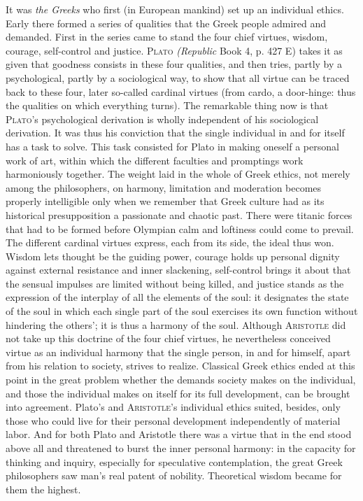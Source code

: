 \documentclass[12pt,a4paper,openany]{book}
\newcommand{\opage}[1]{\marginnote{\footnotesize\textit{[#1]}}}
\begin{document}
It was \textit{the Greeks} who first (in European mankind) set up an individual ethics. Early there formed a
series of qualities that the Greek people admired and demanded. First in the series came to stand the four chief
virtues, wisdom, courage, self-control and justice. \textsc{Plato} \textit{(Republic} Book 4, p. 427 E) takes it as
given that goodness consists in these four qualities, and then tries, partly by a psychological, partly by a
sociological way, to show that all virtue can be traced back to these four, later so-called cardinal virtues
(from cardo, a door-hinge: thus the qualities on which everything turns). The remarkable thing now is that
\textsc{Plato}'s psychological derivation is wholly independent of his sociological derivation. It was thus his
conviction that the single individual in and for itself has a task to solve. This task consisted for Plato in
making oneself a personal work of art, within which the different faculties and promptings work harmoniously
together. The weight laid in the whole of Greek ethics, not merely among the philosophers, on harmony,
limitation and moderation becomes properly intelligible only when we remember that Greek culture had as its
historical presupposition a passionate and chaotic past. There were titanic forces that had to be formed before
Olympian calm and loftiness could come to prevail. The different cardinal virtues express, each from its side,
the ideal thus won.
\opage{202}Wisdom lets thought be the guiding power, courage holds up personal dignity against external resistance
and inner slackening, self-control brings it about that the sensual impulses are limited without being killed,
and justice stands as the expression of the interplay of all the elements of the soul: it designates the state
of the soul in which each single part of the soul exercises its own function without hindering the others'; it
is thus a harmony of the soul. Although \textsc{Aristotle} did not take up this doctrine of the four chief
virtues, he nevertheless conceived virtue as an individual harmony that the single person, in and for himself,
apart from his relation to society, strives to realize. Classical Greek ethics ended at this point in the great
problem whether the demands society makes on the individual, and those the individual makes on itself for its
full development, can be brought into agreement. Plato's and \textsc{Aristotle}'s individual ethics suited,
besides, only those who could live for their personal development independently of material labor. And for both
Plato and Aristotle there was a virtue that in the end stood above all and threatened to burst the inner personal
harmony: in the capacity for thinking and inquiry, especially for speculative contemplation, the great Greek
philosophers saw man's real patent of nobility. Theoretical wisdom became for them the highest.
\end{document}

